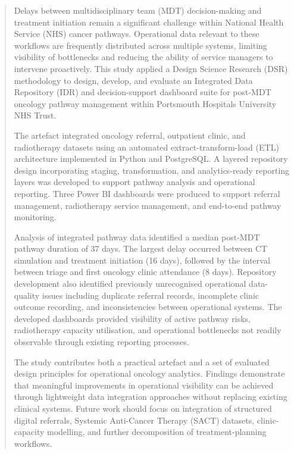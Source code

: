 \begin{abstract}
Delays between multidisciplinary team (MDT) decision-making and treatment initiation remain a significant challenge within National Health Service (NHS) cancer pathways. Operational data relevant to these workflows are frequently distributed across multiple systems, limiting visibility of bottlenecks and reducing the ability of service managers to intervene proactively. This study applied a Design Science Research (DSR) methodology to design, develop, and evaluate an Integrated Data Repository (IDR) and decision-support dashboard suite for post-MDT oncology pathway management within Portsmouth Hospitals University NHS Trust. 
    
    The artefact integrated oncology referral, outpatient clinic, and radiotherapy datasets using an automated extract-transform-load (ETL) architecture implemented in Python and PostgreSQL. A layered repository design incorporating staging, transformation, and analytics-ready reporting layers was developed to support pathway analysis and operational reporting. Three Power BI dashboards were produced to support referral management, radiotherapy service management, and end-to-end pathway monitoring. 
    
    Analysis of integrated pathway data identified a median post-MDT pathway duration of 37 days. The largest delay occurred between CT simulation and treatment initiation (16 days), followed by the interval between triage and first oncology clinic attendance (8 days). Repository development also identified previously unrecognised operational data-quality issues including duplicate referral records, incomplete clinic outcome recording, and inconsistencies between operational systems. The developed dashboards provided visibility of active pathway risks, radiotherapy capacity utilisation, and operational bottlenecks not readily observable through existing reporting processes. 
    
    The study contributes both a practical artefact and a set of evaluated design principles for operational oncology analytics. Findings demonstrate that meaningful improvements in operational visibility can be achieved through lightweight data integration approaches without replacing existing clinical systems. Future work should focus on integration of structured digital referrals, Systemic Anti-Cancer Therapy (SACT) datasets, clinic-capacity modelling, and further decomposition of treatment-planning workflows.
\end{abstract}
